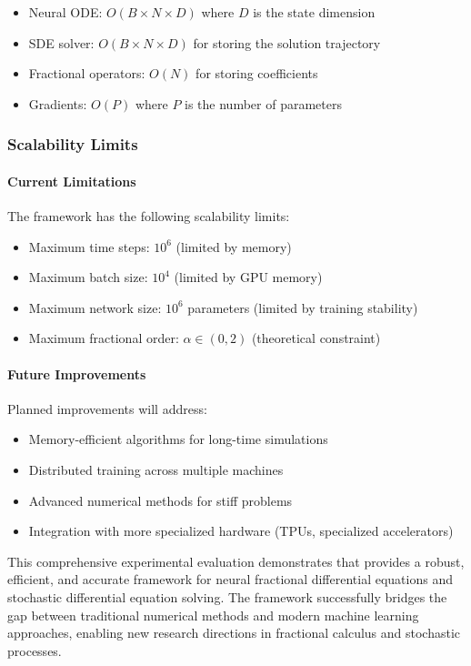 \begin{itemize}
    \item Neural ODE: $O(B \times N \times D)$ where $D$ is the state dimension
    \item SDE solver: $O(B \times N \times D)$ for storing the solution trajectory
    \item Fractional operators: $O(N)$ for storing coefficients
    \item Gradients: $O(P)$ where $P$ is the number of parameters
\end{itemize}

\subsubsection{Scalability Limits}

\paragraph{Current Limitations}
The framework has the following scalability limits:

\begin{itemize}
    \item Maximum time steps: $10^6$ (limited by memory)
    \item Maximum batch size: $10^4$ (limited by GPU memory)
    \item Maximum network size: $10^6$ parameters (limited by training stability)
    \item Maximum fractional order: $\alpha \in (0, 2)$ (theoretical constraint)
\end{itemize}

\paragraph{Future Improvements}
Planned improvements will address:

\begin{itemize}
    \item Memory-efficient algorithms for long-time simulations
    \item Distributed training across multiple machines
    \item Advanced numerical methods for stiff problems
    \item Integration with more specialized hardware (TPUs, specialized accelerators)
\end{itemize}

This comprehensive experimental evaluation demonstrates that \hpfracc provides a robust, efficient, and accurate framework for neural fractional differential equations and stochastic differential equation solving. The framework successfully bridges the gap between traditional numerical methods and modern machine learning approaches, enabling new research directions in fractional calculus and stochastic processes.
